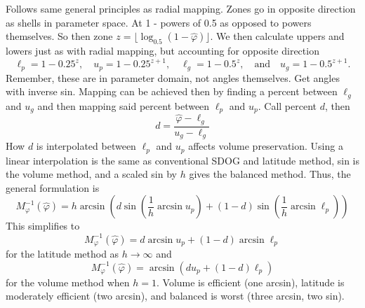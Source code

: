 Follows same general principles as radial mapping.
Zones go in opposite direction as shells in parameter space.
At 1 - powers of 0.5 as opposed to powers themselves.
So then zone $z = \lfloor \log_{0.5} ( 1 - \hat{\varphi} ) \rfloor$.
We then calculate uppers and lowers just as with radial mapping, but accounting for opposite direction
%
\begin{equation*}
\ell_p = 1 - 0.25^{z}, \quad u_p = 1 - 0.25^{z + 1}, \quad \ell_g = 1 - 0.5^z, \quad \text{and} \quad u_g = 1 - 0.5^{z + 1}.
\end{equation*}
%
Remember, these are in parameter domain, not angles themselves. Get angles with inverse sin.
Mapping can be achieved then by finding a percent between $\ell_g$ and $u_g$ and then mapping said percent between $\ell_p$ and $u_p$.
Call percent $d$, then
%
\begin{equation} \label{eq:latInvD}
d = \frac{ \hat{\varphi} - \ell_g }{ u_g - \ell_g }
\end{equation}
%
How $d$ is interpolated between $\ell_p$ and $u_p$ affects volume preservation.
Using a linear interpolation is the same as conventional SDOG and latitude method, sin is the volume method, and a scaled sin by $h$ gives the balanced method.
Thus, the general formulation is
%
\begin{equation} \label{eq:latInv}
M_\varphi^{-1}(\hat{\varphi}) = h \arcsin \left( d \sin \left( \frac{1}{h} \arcsin u_p \right) + \left( 1 - d \right) \sin \left( \frac{1}{h} \arcsin \ell_p \right) \right)
\end{equation}
%
This simplifies to
%
\begin{equation*}
M_\varphi^{-1}(\hat{\varphi}) = d \arcsin u_p  + \left( 1 - d \right) \arcsin \ell_p
\end{equation*}
%
for the latitude method as $h \rightarrow \infty$ and
%
\begin{equation*}
M_\varphi^{-1}(\hat{\varphi}) = \arcsin \left( d u_p + \left( 1 - d \right) \ell_p \right)
\end{equation*}
%
for the volume method when $h = 1$.
Volume is efficient (one arcsin), latitude is moderately efficient (two arcsin), and balanced is worst (three arcsin, two sin).


